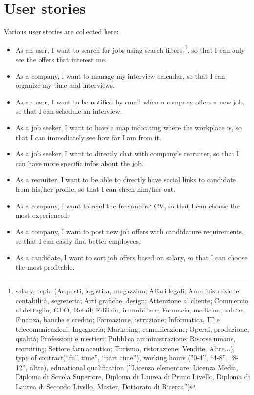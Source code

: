 \documentclass[12pt, a4paper]{article}
\begin{document}
\section{User stories}
Various user stories are collected here:
\begin{itemize}
	\item As an user, I want to search for jobs using search filters
		\footnote{salary, topic (Acquisti, logistica, magazzino; Affari legali; 
		Amministrazione contabilità, segreteria; Arti grafiche, design; 
		Attenzione al cliente; Commercio al dettaglio, GDO, Retail; Edilizia, immobiliare;  
		Farmacia, medicina, salute; Finanza, banche e credito; Formazione, istruzione; 
		Informatica, IT e telecomunicazioni; Ingegneria; Marketing, comunicazione; 
		Operai, produzione, qualità; Professioni e mestieri; 
		Pubblica amministrazione; Risorse umane, recruiting; Settore farmaceutico; 
		Turismo, ristorazione; Vendite; Altre...), type of contract(“full time”, “part time”), working hours (”0-4”, “4-8”, “8-12”, altro), 
		educational qualification (”Licenza elementare, Licenza Media, Diploma di Scuola Superiore, 
		Diploma di Laurea di Primo Livello, Diploma di Laurea di Secondo Livello, Master, Dottorato di Ricerca”)}, 
		so that I can only see the offers that interest me.
	\item As a company, I want to manage my interview calendar, 
		so that I can organize my time and interviews.
	\item As an user, I want to be notified by email when a company 
		offers a new job, so that I can schedule an interview.
	\item As a job seeker, I want to have a map indicating where the workplace is,
		so that I can immediately see how far I am from it.
	\item As a job seeker, I want to directly chat with company's recruiter,
		so that I can have more specific infos about the job.
	\item As a recruiter, I want to be able to directly have social links to candidate from his/her profile,
		so that I can check him/her out.
	\item As a company, I want to read the freelancers‘ CV, 
		so that I can choose the most experienced.
	\item As a company, I want to post new job offers with candidature 
		requirements, so that I can easily find better employees.
	\item As a candidate, I want to sort job offers based on salary, 
		so that I can choose the most profitable.  
\end{itemize}
\end{document}
